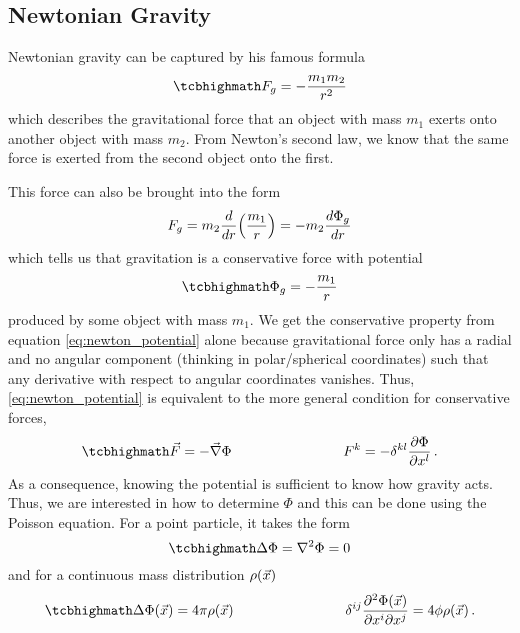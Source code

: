 

		\subsection{Newtonian Gravity}
Newtonian gravity can be captured by his famous formula
\begin{equation}
\eqbox{
F_g = - \frac{m_1 m_2}{r^2}
}
\end{equation}
which describes the gravitational force that an object with mass $m_1$ exerts onto another object with mass $m_2$. From Newton's second law, we know that the same force is exerted from the second object onto the first.


This force can also be brought into the form
\begin{equation}\label{eq:newton_potential}
F_g = m_2 \dv{r}\qty(\frac{m_1}{r}) = - m_2 \dv{\Phi_g}{r}
\end{equation}
which tells us that gravitation is a conservative force with potential 
\begin{equation}
\eqbox{
\Phi_g = - \frac{m_1}{r}
}
\end{equation}
produced by some object with mass $m_1$. We get the conservative property from equation \eqref{eq:newton_potential} alone because gravitational force only has a radial and no angular component (thinking in polar/spherical coordinates) such that any derivative with respect to angular coordinates %
 vanishes. Thus, \eqref{eq:newton_potential} is equivalent to the more general condition for conservative forces,
\begin{equation}\label{eq:cons_force}
\eqbox{
\vec{F} = - \vec{\nabla} \Phi
}
\manyqquad
F^k = - \delta^{k l} \pdv{\Phi}{x^l} \, .
\end{equation}
As a consequence, knowing the potential is sufficient to know how gravity acts. Thus, we are interested in how to determine $\Phi$ and this can be done using the Poisson equation. For a point particle, it takes the form
\begin{equation}
\eqbox{
\Delta \Phi = \nabla^2 \Phi = 0
}
\end{equation}
and for a continuous mass distribution $\rho\qty(\vec{x})$
\begin{equation}\label{eq:field_eq_newton}
\eqbox{
\Delta \Phi\qty(\vec{x}) = 4 \pi \rho\qty(\vec{x})
}
\manyqquad
\delta^{ij} \pdv[2]{\Phi(\vec{x})}{x^i}{x^j} = 4 \phi \rho\qty(\vec{x}) \, .
\end{equation}

